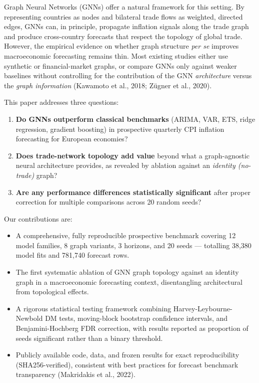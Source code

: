 \documentclass[
  11pt,
  a4paper]{article}
\providecommand{\tightlist}{%
  \setlength{\itemsep}{0pt}\setlength{\parskip}{0pt}}
\begin{document}
Graph Neural Networks (GNNs) offer a natural framework for this setting.
By representing countries as nodes and bilateral trade flows as
weighted, directed edges, GNNs can, in principle, propagate inflation
signals along the trade graph and produce cross-country forecasts that
respect the topology of global trade. However, the empirical evidence on
whether graph structure \emph{per se} improves macroeconomic forecasting
remains thin. Most existing studies either use synthetic or
financial-market graphs, or compare GNNs only against weaker baselines
without controlling for the contribution of the GNN \emph{architecture}
versus the \emph{graph information} (Kawamoto et al., 2018; Zügner et
al., 2020).

This paper addresses three questions:

\begin{enumerate}
\def\labelenumi{\arabic{enumi}.}
\tightlist
\item
  \textbf{Do GNNs outperform classical benchmarks} (ARIMA, VAR, ETS,
  ridge regression, gradient boosting) in prospective quarterly CPI
  inflation forecasting for European economies?
\item
  \textbf{Does trade-network topology add value} beyond what a
  graph-agnostic neural architecture provides, as revealed by ablation
  against an \emph{identity (no-trade)} graph?
\item
  \textbf{Are any performance differences statistically significant}
  after proper correction for multiple comparisons across 20 random
  seeds?
\end{enumerate}

Our contributions are:

\begin{itemize}
\tightlist
\item
  A comprehensive, fully reproducible prospective benchmark covering 12
  model families, 8 graph variants, 3 horizons, and 20 seeds ---
  totalling 38,380 model fits and 781,740 forecast rows.
\item
  The first systematic ablation of GNN graph topology against an
  identity graph in a macroeconomic forecasting context, disentangling
  architectural from topological effects.
\item
  A rigorous statistical testing framework combining
  Harvey-Leybourne-Newbold DM tests, moving-block bootstrap confidence
  intervals, and Benjamini-Hochberg FDR correction, with results
  reported as proportion of seeds significant rather than a binary
  threshold.
\item
  Publicly available code, data, and frozen results for exact
  reproducibility (SHA256-verified), consistent with best practices for
  forecast benchmark transparency (Makridakis et al., 2022).
\end{itemize}
\end{document}
